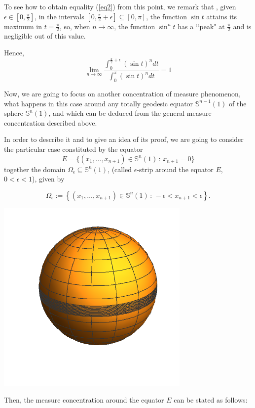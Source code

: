 \documentclass{amsart}
\theoremstyle{definition}
\theoremstyle{remark}
\begin{document}
To see how to obtain equality (\ref{eq2}) from this point, we remark that , given $\epsilon \in [0,\frac{\pi}{2}]$,  in the intervals $[0, \frac{\pi}{2}+\epsilon] \subseteq [0,\pi]$, the function $\sin t$ attains its maximum in $t=\frac{\pi}{2}$, so, when $n \to \infty$, the function $\sin^n t$ has a \lq\lq peak" at $\frac{\pi}{2}$ and is negligible out of this value. 

Hence, 
$$\lim_{n \to \infty} \frac{\int _0^{\frac{\pi}{2}+\epsilon} (\sin t)^n dt }{\int _0^\pi (\sin t)^n dt   }=1$$
\bigskip

Now, we are going to focus on another concentration of measure phenomenon, what happens in this case around any totally geodesic equator $\mathbb{S}^{n-1}(1)$ of the sphere $ \mathbb{S}^{n}(1)$, and which can be deduced from the general measure concentration described above. 

In order to describe it and to give an idea of its proof, we are going to consider the particular case constituted by the equator 
$$E=\{(x_1,\ldots,x_{n+1})\in \mathbb{S}^{n}(1)\, :\, x_{n+1}=0\}$$
together the domain $\Omega_\epsilon \subseteq  \mathbb{S}^{n}(1) $, (called $\epsilon$-strip around the equator $E$, $0<\epsilon <1$), given by

$$
\Omega_\epsilon:=\left\lbrace  (x_1,\ldots,x_{n+1})\in \mathbb{S}^{n}(1)\, :\, -\epsilon<x_{n+1}<\epsilon\right\rbrace.
$$

\begin{center}
\includegraphics[scale=0.35]{eferaifranja.pdf}
\end{center}

Then, the measure concentration around the equator $E$ can be stated as  follows: 
\end{document}
